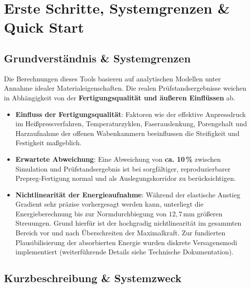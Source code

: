 \chapter{Erste Schritte, Systemgrenzen \& Quick Start} \label{ch:quickstart}

\section{Grundverständnis \& Systemgrenzen} \label{sec:systemgrenzen}

\begin{tcolorbox}[colback=warnbg,colframe=warnred,arc=2mm,title=\textbf{ACHTUNG: Theoretische Simulation vs. Reale Fertigung}]
Die Berechnungen dieses Tools basieren auf analytischen Modellen unter Annahme idealer Materialeigenschaften. 
Die realen Prüfstandsergebnisse weichen in Abhängigkeit von der \textbf{Fertigungsqualität und äußeren Einflüssen} ab.
\end{tcolorbox}

\begin{itemize}
    \item \textbf{Einfluss der Fertigungsqualität}: Faktoren wie der effektive Anpressdruck im Heißpressverfahren, Temperaturzyklen, Faserauslenkung, Porengehalt und Harzaufnahme der offenen Wabenkammern beeinflussen die Steifigkeit und Festigkeit maßgeblich.
    \item \textbf{Erwartete Abweichung}: Eine Abweichung von \textbf{ca. 10\,\%} zwischen Simulation und Prüfstandsergebnis ist bei sorgfältiger, reproduzierbarer Prepreg-Fertigung normal und als Auslegungskorridor zu berücksichtigen.
    \item \textbf{Nichtlinearität der Energieaufnahme}: Während der elastische Anstieg Gradient sehr präzise vorhergesagt werden kann, unterliegt die Energieberechnung bis zur Normdurchbiegung von $12{,}7\,\text{mm}$ größeren Streuungen. 
        Grund hierfür ist der hochgradig nichtlinearität im gesammten Bereich vor und nach Überschreiten der Maximalkraft. Zur fundierten Plausibilisierung der absorbierten Energie wurden diskrete Versagensmodi implementiert (weiterführende Details siehe Technische Dokumentation).   
\end{itemize}
\clearpage










\section{Kurzbeschreibung \& Systemzweck} \label{sec:systemzweck}

